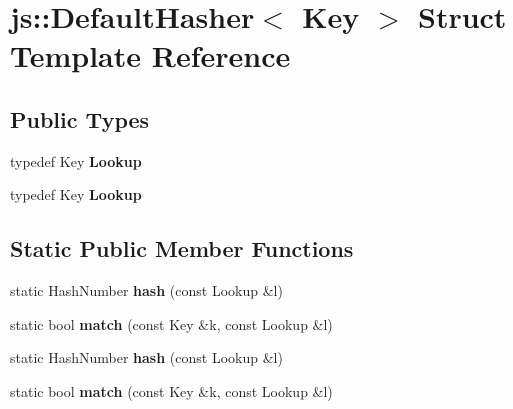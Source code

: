 \hypertarget{structjs_1_1_default_hasher}{\section{js\-:\-:Default\-Hasher$<$ Key $>$ Struct Template Reference}
\label{structjs_1_1_default_hasher}
}
\subsection*{Public Types}
\begin{DoxyCompactItemize}
\item 
\hypertarget{structjs_1_1_default_hasher_a247fd858836dd669822536954881b3ad}{typedef Key {\bfseries Lookup}}\label{structjs_1_1_default_hasher_a247fd858836dd669822536954881b3ad}

\item 
\hypertarget{structjs_1_1_default_hasher_a247fd858836dd669822536954881b3ad}{typedef Key {\bfseries Lookup}}\label{structjs_1_1_default_hasher_a247fd858836dd669822536954881b3ad}

\end{DoxyCompactItemize}
\subsection*{Static Public Member Functions}
\begin{DoxyCompactItemize}
\item 
\hypertarget{structjs_1_1_default_hasher_a2e88f56d27fbc504cfdcf728b265e031}{static Hash\-Number {\bfseries hash} (const Lookup \&l)}\label{structjs_1_1_default_hasher_a2e88f56d27fbc504cfdcf728b265e031}

\item 
\hypertarget{structjs_1_1_default_hasher_ab055501c8df279cba0559f8d42da2553}{static bool {\bfseries match} (const Key \&k, const Lookup \&l)}\label{structjs_1_1_default_hasher_ab055501c8df279cba0559f8d42da2553}

\item 
\hypertarget{structjs_1_1_default_hasher_a2e88f56d27fbc504cfdcf728b265e031}{static Hash\-Number {\bfseries hash} (const Lookup \&l)}\label{structjs_1_1_default_hasher_a2e88f56d27fbc504cfdcf728b265e031}

\item 
\hypertarget{structjs_1_1_default_hasher_ab055501c8df279cba0559f8d42da2553}{static bool {\bfseries match} (const Key \&k, const Lookup \&l)}\label{structjs_1_1_default_hasher_ab055501c8df279cba0559f8d42da2553}

\end{DoxyCompactItemize}
